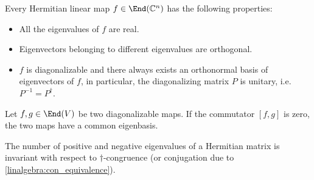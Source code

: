     \begin{property}\label{linalgebra:diagonalizable_hermitian}
        Every Hermitian linear map $f\in\End(\mathbb{C}^n)$ has the following properties:
        \begin{itemize}
            \item All the eigenvalues of $f$ are real.
            \item Eigenvectors belonging to different eigenvalues are orthogonal.
            \item $f$ is diagonalizable and there always exists an orthonormal basis of eigenvectors of $f$, in particular, the diagonalizing matrix $P$ is unitary, i.e.~$P^{-1}=P^\dag$.
        \end{itemize}
    \end{property}

    \begin{property}[Commutator]
        Let $f,g\in\End(V)$ be two diagonalizable maps. If the commutator $[f,g]$ is zero, the two maps have a common eigenbasis.
    \end{property}

    \begin{theorem}\label{linalgebra:sylvester}
        The number of positive and negative eigenvalues of a Hermitian matrix is invariant with respect to $\dag$-congruence (or conjugation due to \cref{linalgebra:con_equivalence}).
    \end{theorem}